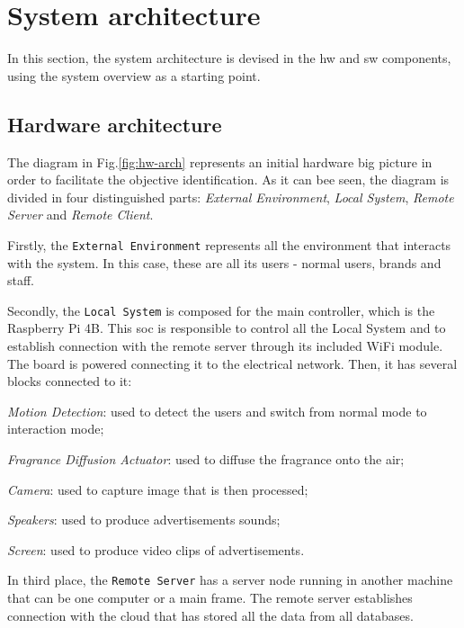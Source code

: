 %
\section{System architecture}
\label{sec:system-architecture}
In this section, the system architecture is devised in the \gls{hw} and \gls{sw} components, using the system overview as a starting point. 

\subsection{Hardware architecture}
\label{sec:hardw-arch}
%
The diagram in Fig.\ref{fig:hw-arch} represents an initial hardware big picture in order to facilitate the objective identification.
As it can bee seen, the diagram is divided in four distinguished parts: \emph{External Environment}, \emph{Local System}, \emph{Remote Server} and \emph{Remote Client}.

Firstly, the \texttt{External Environment} represents all the environment that interacts with the system. In this case, these are all its users - normal users, brands and staff.

Secondly, the \texttt{Local System} is composed for the main controller, which is the Raspberry Pi 4B. 
This \gls{soc} is responsible to control all the Local System and to establish connection with the remote server through its included WiFi module. 
The board is powered connecting it to the electrical network. 
Then, it has several blocks connected to it:
%
\begin{item-c}
\item \emph{Motion Detection}: used to detect the users and switch from normal mode to interaction mode;
\item \emph{Fragrance Diffusion Actuator}: used to diffuse the fragrance onto the air;
\item \emph{Camera}: used to capture image that is then processed;
\item \emph{Speakers}: used to produce advertisements sounds;
\item \emph{Screen}: used to produce video clips of advertisements.
\end{item-c}
%

In third place, the \texttt{Remote Server} has a server node running in another machine that can be one computer or a main frame.
The remote server establishes connection with the cloud that has stored all the data from all databases.

